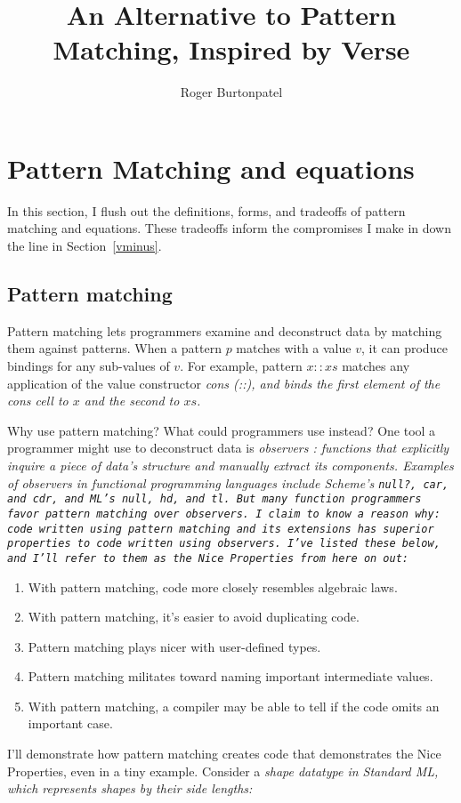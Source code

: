\documentclass[manuscript,screen,review, 12pt, nonacm]{acmart}
\title{An Alternative to Pattern Matching, Inspired by Verse}
\author{Roger Burtonpatel}
\affiliation{%
  \institution{Tufts University}
  \streetaddress{419 Boston Ave}
  \city{Medford}
  \state{Massachusetts}
  \country{USA}
  \postcode{02155}
}
\begin{document}
\section{Pattern Matching and equations}
\label{pmandequations}

In this section, I flush out the definitions, forms, and tradeoffs of pattern
matching and equations. These tradeoffs inform the compromises I make in
\VMinus down the line in Section~\ref{vminus}.

\subsection{Pattern matching}
\label{pmoverobservers}


Pattern matching lets programmers examine and deconstruct data by matching them
against patterns. When a pattern $p$ matches with a value $v$, it can produce
bindings for any sub-values of $v$. For example, pattern $x::xs$ matches any 
application of the value constructor \it{cons} (\it{::}), and binds the first 
element of the cons cell to $x$ and the second to $xs$. 

Why use pattern matching? What could programmers use instead? One tool a
programmer might use to deconstruct data is \it{observers}
\citep{liskov:abstraction}: functions that explicitly inquire a piece of data's
structure and manually extract its components. Examples of observers in
functional programming languages include Scheme's \tt{null?}, \tt{car}, and
\tt{cdr}, and ML's \tt{null}, \tt{hd}, and \tt{tl}. But many function
programmers favor pattern matching over observers. I claim to know a reason why:
\it{code written using pattern matching and its extensions has superior
properties to code written using observers}. I've listed these below, and I'll
refer to them as the Nice Properties from here on out: 
\bf{\begin{enumerate}
    \item With pattern matching, code more closely resembles algebraic laws. 
    \label{p1}
    \item With pattern matching, it's easier to avoid duplicating code.
    \label{p2}
    \item Pattern matching plays nicer with user-defined types. 
    \label{p3}
    \item Pattern matching militates toward naming important intermediate
    values. \nolinebreak
    \label{p4}
    \item With pattern matching, a compiler may be able to tell if the code
    omits an important case. 
    \label{p5}
\end{enumerate}}
I'll demonstrate how pattern matching creates code that demonstrates the Nice
Properties, even in a tiny example. Consider a \it{shape} datatype in Standard
ML, which represents shapes by their side lengths: 
\end{document}
